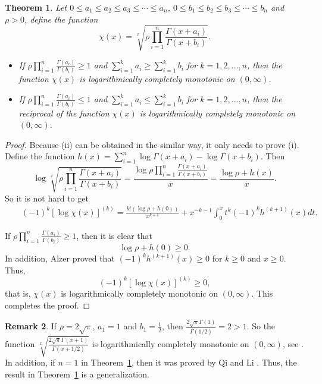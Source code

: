 \documentclass[12pt,reqno]{article}
\newtheorem{thm}{Theorem}[section]
\theoremstyle{definition}
\newtheorem{rem}[thm]{Remark}
\numberwithin{equation}{section}
\begin{document}
\begin{thm}\label{thm+comp}
Let $0\leq a_1\leq a_2\leq a_3\leq\cdots\leq a_n$, $0\leq b_1\leq
b_2\leq b_3\leq\cdots\leq b_n$ and $\rho>0$, define the function
$$\chi(x)=\sqrt[x]{\rho\prod_{i=1}^n\frac{\Gamma(x+a_i)}{\Gamma(x+b_i)}}.$$
\begin{itemize}
\item [\rm (i)]
If $\rho\prod_{i=1}^n\frac{\Gamma(a_i)}{\Gamma(b_i)}\geq1$ and
$\sum_{i=1}^ka_i\geq \sum_{i=1}^kb_i$ for $k=1,2,\ldots,n$, then the
function $\chi(x)$ is logarithmically completely monotonic on
$(0,\infty)$.
\item [\rm (ii)]
If $\rho\prod_{i=1}^n\frac{\Gamma(a_i)}{\Gamma(b_i)}\leq1$ and
$\sum_{i=1}^ka_i\leq \sum_{i=1}^kb_i$ for $k=1,2,\ldots,n$, then the
reciprocal of the function $\chi(x)$ is logarithmically completely
monotonic on $(0,\infty)$.
\end{itemize}
\end{thm}

\begin{proof} Because (ii) can be obtained in the similar
way, it only needs to prove (i). Define the function
$h(x)=\sum_{i=1}^n\log \Gamma(x+a_i)-\log\Gamma(x+b_i)$. Then
$$\log\sqrt[x]{\rho\prod_{i=1}^n\frac{\Gamma(x+a_i)}{\Gamma(x+b_i)}}=\frac{\log\rho\prod_{i=1}^n\frac{\Gamma(x+a_i)}{\Gamma(x+b_i)}}{x}
=\frac{\log\rho+h(x)}{x}.$$ So it is not hard to get
\begin{eqnarray}\label{muti}
&&(-1)^k[\log\chi(x)]^{(k)}=\frac{k!(\log\rho+h(0))}{x^{k+1}}+x^{-k-1}\int_0^x
t^k (-1)^kh^{(k+1)}(x)dt.
\end{eqnarray}

If $\rho\prod_{i=1}^n\frac{\Gamma(a_i)}{\Gamma(b_i)}\geq1$, then it
is clear that $$\log\rho+h(0)\geq0.$$ In addition, Alzer \cite{Al97}
proved that $(-1)^kh^{(k+1)}(x)\geq0$ for $k\geq0$ and $x\geq0$.
Thus, $$(-1)^k[\log\chi(x)]^{(k)}\geq0,$$ that is, $\chi(x)$ is
logarithmically completely monotonic on $(0,\infty)$. This completes
the proof.
\end{proof}
\begin{rem}
If $\rho=2\sqrt{\pi}$, $a_1=1$ and $b_1=\frac{1}{2}$, then
$\frac{2\sqrt{\pi}\Gamma(1)}{\Gamma(1/2)}=2>1$. So the function
$\sqrt[x]{\frac{2\sqrt{\pi}\Gamma(x+1)}{\Gamma(x+1/2)}}$ is
logarithmically completely monotonic on $(0,\infty)$, see
\cite{LT11}. In addition, if $n=1$ in Theorem~\ref{thm+comp}, then
it was proved by Qi and Li \cite{QL13}. Thus, the result in
Theorem~\ref{thm+comp} is a generalization.
\end{rem}
\end{document}
